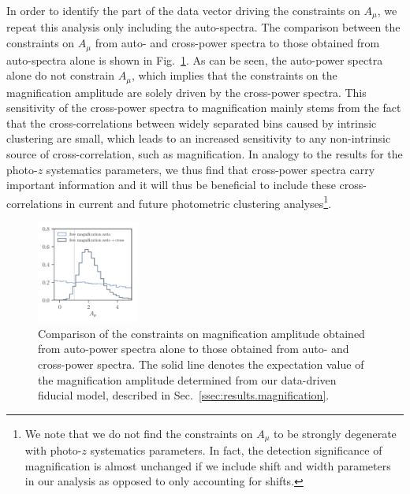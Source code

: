 \documentclass[a4paper,11pt]{article}
\begin{document}
    In order to identify the part of the data vector driving the constraints on $A_{\mu}$, we repeat this analysis only including the auto-spectra. The comparison between the constraints on $A_{\mu}$ from auto- and cross-power spectra to those obtained from auto-spectra alone is shown in Fig.~\ref{fig:constraints-fit=mag-bias-ampl_fit=auto+cross-vs-fit=mag-bias-ampl_fit=auto}. As can be seen, the auto-power spectra alone do not constrain $A_{\mu}$, which implies that the constraints on the magnification amplitude are solely driven by the cross-power spectra. This sensitivity of the cross-power spectra to magnification mainly stems from the fact that the cross-correlations between widely separated bins caused by intrinsic clustering are small, which leads to an increased sensitivity to any non-intrinsic source of cross-correlation, such as magnification. In analogy to the results for the photo-$z$ systematics parameters, we thus find that cross-power spectra carry important information and it will thus be beneficial to include these cross-correlations in current and future photometric clustering analyses\footnote{We note that we do not find the constraints on $A_{\mu}$ to be strongly degenerate with photo-$z$ systematics parameters. In fact, the detection significance of magnification is almost unchanged if we include shift and width parameters in our analysis as opposed to only accounting for shifts.}. 

    \begin{figure}
      \begin{center}
        \includegraphics[width=0.3\textwidth]{figures/contours-A_mu_mPk=HOD_fix=alpha-fc-sigmaM_HOD=zevol_fit=pz-shifts+prior=0p2-pz-widths+prior=0p2_fit=auto+cross_cosmo=const-LINBIAS_HOD-param=zfid_clfit=HOD-zevol_mag-bias-free-fit=auto+cross-vs-mag-bias-free-fit=auto.pdf}
        \caption{Comparison of the constraints on magnification amplitude obtained from auto-power spectra alone to those obtained from auto- and cross-power spectra. The solid line denotes the expectation value of the magnification amplitude determined from our data-driven fiducial model, described in Sec.~\ref{ssec:results.magnification}.}
        \label{fig:constraints-fit=mag-bias-ampl_fit=auto+cross-vs-fit=mag-bias-ampl_fit=auto}
      \end{center}
    \end{figure}
\end{document}

